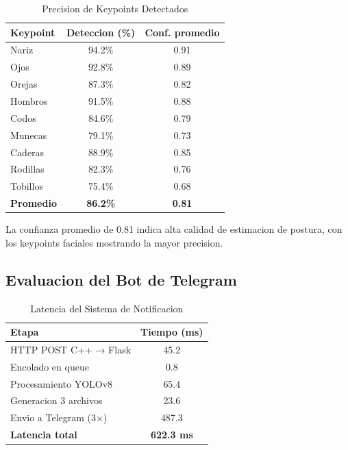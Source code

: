 \documentclass[conference]{IEEEtran}
\begin{document}
\begin{table}[htbp]
\caption{Precision de Keypoints Detectados}
\begin{center}
\begin{tabular}{|l|c|c|}
\hline
\textbf{Keypoint} & \textbf{Deteccion (\%)} & \textbf{Conf. promedio} \\
\hline
Nariz & 94.2\% & 0.91 \\
Ojos & 92.8\% & 0.89 \\
Orejas & 87.3\% & 0.82 \\
Hombros & 91.5\% & 0.88 \\
Codos & 84.6\% & 0.79 \\
Munecas & 79.1\% & 0.73 \\
Caderas & 88.9\% & 0.85 \\
Rodillas & 82.3\% & 0.76 \\
Tobillos & 75.4\% & 0.68 \\
\hline
\textbf{Promedio} & \textbf{86.2\%} & \textbf{0.81} \\
\hline
\end{tabular}
\label{tab:keypoints}
\end{center}
\end{table}

La confianza promedio de 0.81 indica alta calidad de estimacion de postura, con los keypoints faciales mostrando la mayor precision.

\subsection{Evaluacion del Bot de Telegram}

\begin{table}[htbp]
\caption{Latencia del Sistema de Notificacion}
\begin{center}
\begin{tabular}{|l|c|}
\hline
\textbf{Etapa} & \textbf{Tiempo (ms)} \\
\hline
HTTP POST C++ → Flask & 45.2 \\
Encolado en queue & 0.8 \\
Procesamiento YOLOv8 & 65.4 \\
Generacion 3 archivos & 23.6 \\
Envio a Telegram (3×) & 487.3 \\
\hline
\textbf{Latencia total} & \textbf{622.3 ms} \\
\hline
\end{tabular}
\label{tab:bot_latency}
\end{center}
\end{table}
\end{document}
